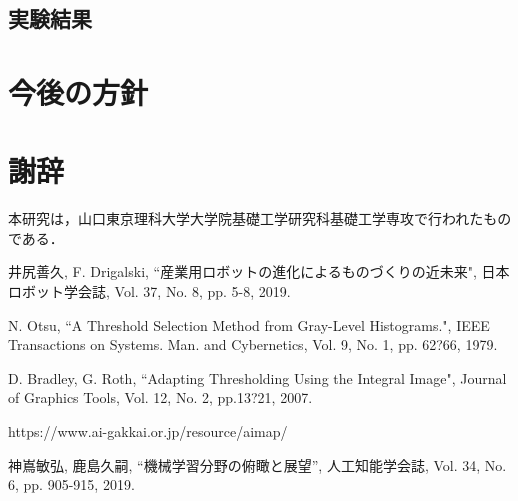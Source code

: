 \documentclass{suribt}
\begin{document}
\section{実験結果}


\chapter{今後の方針}









\backmatter%
\chapter{謝辞}%
本研究は，山口東京理科大学大学院基礎工学研究科基礎工学専攻で行われたものである．
\begin{thebibliography}{}%
井尻善久, F. Drigalski, ``産業用ロボットの進化によるものづくりの近未来", 日本ロボット学会誌, Vol. 37, No. 8, pp. 5-8, 2019.

N. Otsu, ``A Threshold Selection Method from Gray-Level Histograms.", IEEE Transactions on Systems. Man. and Cybernetics, Vol. 9, No. 1, pp. 62?66, 1979.

D. Bradley, G. Roth, ``Adapting Thresholding Using the Integral Image", Journal of Graphics Tools, Vol. 12, No. 2, pp.13?21, 2007.

https://www.ai-gakkai.or.jp/resource/aimap/

神嶌敏弘, 鹿島久嗣, ``機械学習分野の俯瞰と展望'', 人工知能学会誌, Vol. 34, No. 6, pp. 905-915, 2019.

\end{thebibliography}
\end{document}
